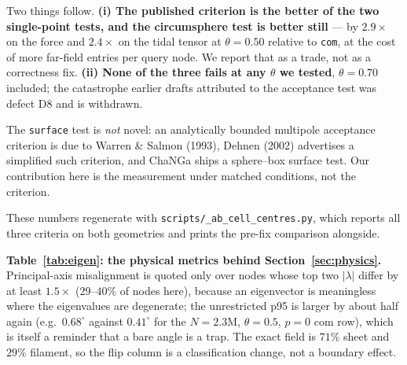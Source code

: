 \begin{center}
\end{center}

\noindent Two things follow. \textbf{(i) The published criterion is the better of the two single-point
tests, and the circumsphere test is better still} --- by $2.9\times$ on the force and $2.4\times$ on
the tidal tensor at $\theta=0.50$ relative to \texttt{com}, at the cost of more far-field entries per
query node. We report that as a trade, not as a correctness fix. \textbf{(ii) None of the three fails
at any $\theta$ we tested}, $\theta=0.70$ included; the catastrophe earlier drafts attributed to the
acceptance test was defect D8 and is withdrawn.

The \texttt{surface} test is \emph{not} novel: an analytically bounded multipole acceptance criterion
is due to Warren \& Salmon (1993), Dehn\-en (2002) advertises a simplified such criterion, and ChaNGa
ships a sphere--box surface test. Our contribution here is the measurement under matched conditions,
not the criterion.

These numbers regenerate with \texttt{scripts/\allowbreak \_\allowbreak ab\_\allowbreak cell\_\allowbreak centres.\allowbreak py}, which reports all three
criteria on both geometries and prints the pre-fix comparison alongside.

\noindent\textbf{Table~\ref{tab:eigen}: the physical metrics behind Section~\ref{sec:physics}.}
Principal-axis misalignment is quoted only over nodes whose top two $|\lambda|$ differ by at least
$1.5\times$ ($29$--$40\%$ of nodes here), because an eigenvector is meaningless where the eigenvalues
are degenerate; the unrestricted p95 is larger by about half again (e.g.\ $0.68^{\circ}$ against
$0.41^{\circ}$ for the $N=2.3$M, $\theta=0.5$, $p{=}0$ com row), which is itself a reminder that a
bare angle is a trap. The
exact field is $71\%$ sheet and $29\%$ filament, so the flip column is a classification change, not a
boundary effect.

